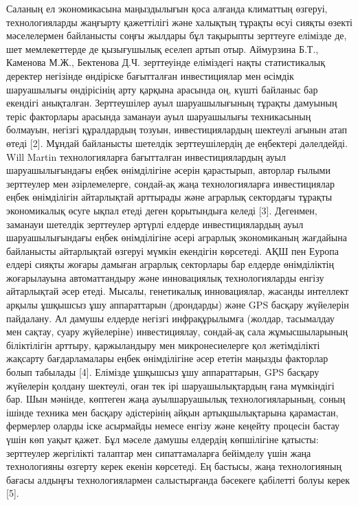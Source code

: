 {{Саланың ел экономикасына маңыздылығын қоса алғанда климаттың өзгеруі,
технологияларды жаңғырту қажеттілігі және халықтың тұрақты өсуі сияқты
өзекті мәселелермен байланысты соңғы жылдары бұл тақырыпты зерттеуге
елімізде де, шет мемлекеттерде де қызығушылық еселеп артып отыр.
Аймурзина Б.Т., Каменова М.Ж., Бектенова Д.Ч. зерттеуінде еліміздегі
нақты статистикалық деректер негізінде өндіріске бағытталған
инвестициялар мен өсімдік шаруашылығы өндірісінің арту қарқына арасында
оң, күшті байланыс бар екендігі анықталған. Зерттеушілер ауыл
шаруашылығының тұрақты дамуының теріс факторлары арасында заманауи ауыл
шаруашылығы техникасының болмауын, негізгі құралдардың тозуын,
инвестициялардың шектеулі ағынын атап өтеді {[}2{]}. Мұндай байланысты
шетелдік зерттеушілердің де еңбектері дәлелдейді. Will Martin
технологияларға бағытталған инвестициялардың ауыл шаруашылығындағы еңбек
өнімділігіне әсерін қарастырып, авторлар ғылыми зерттеулер мен
әзірлемелерге, сондай-ақ жаңа технологияларға инвестициялар еңбек
өнімділігін айтарлықтай арттырады және аграрлық сектордағы тұрақты
экономикалық өсуге ықпал етеді деген қорытындыға келеді {[}3{]}.
Дегенмен, заманауи шетелдік зерттеулер әртүрлі елдерде инвестициялардың
ауыл шаруашылығындағы еңбек өнімділігіне әсері аграрлық экономиканың
жағдайына байланысты айтарлықтай өзгеруі мүмкін екендігін көрсетеді. АҚШ
пен Еуропа елдері сияқты жоғары дамыған аграрлық секторлары бар елдерде
өнімділіктің жоғарылауына автоматтандыру және инновациялық
технологияларды енгізу айтарлықтай әсер етеді. Мысалы, генетикалық
инновациялар, жасанды интеллект арқылы ұшқышсыз ұшу аппараттарын
(дрондарды) және GPS басқару жүйелерін пайдалану. Ал дамушы елдерде
негізгі инфрақұрылымға (жолдар, тасымалдау мен сақтау, суару жүйелеріне)
инвестициялау, сондай-ақ сала жұмысшыларының біліктілігін арттыру,
қаржыландыру мен микронесиелерге қол жетімділікті жақсарту
бағдарламалары еңбек өнімділігіне әсер ететін маңызды факторлар болып
табылады {[}4{]}. Елімізде ұшқышсыз ұшу аппараттарын, GPS басқару
жүйелерін қолдану шектеулі, оған тек ірі шаруашылықтардың ғана
мүмкіндігі бар. Шын мәнінде, көптеген жаңа ауылшаруашылық
технологияларының, соның ішінде техника мен басқару әдістерінің айқын
артықшылықтарына қарамастан, фермерлер оларды іске асырмайды немесе
енгізу және кеңейту процесін бастау үшін көп уақыт қажет. Бұл мәселе
дамушы елдердің көпшілігіне қатысты: зерттеулер жергілікті талаптар мен
сипаттамаларға бейімделу үшін жаңа технологияны өзгерту керек екенін
көрсетеді. Ең бастысы, жаңа технологияның бағасы алдыңғы
технологиялармен салыстырғанда бәсекеге қабілетті болуы керек {[}5{]}.

}}
